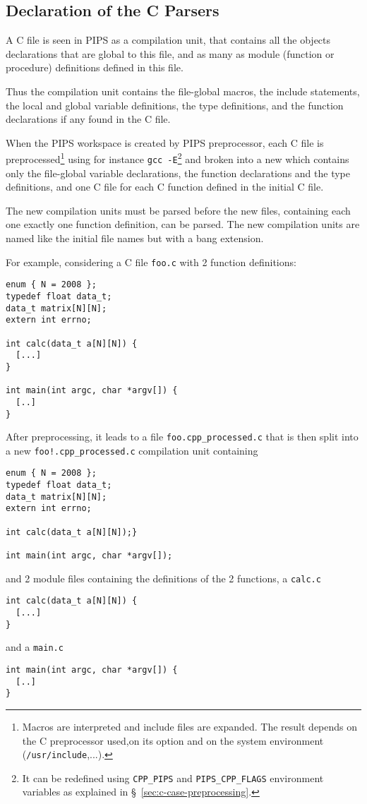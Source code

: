 \documentclass[a4paper]{report}
\begin{document}
\subsection{Declaration of the C Parsers}
\label{subsection:declaration-of-the-C-parsers}

A C file is seen in PIPS as a compilation unit, that contains all the
objects declarations that are global to this file, and as many as module
(function or procedure) definitions defined in this file.

Thus the compilation unit contains the file-global macros, the include
statements, the local and global variable definitions, the type
definitions, and the function declarations if any found in the C file.

When the PIPS workspace is created by PIPS preprocessor, each C file is
preprocessed\footnote{Macros are interpreted and include files are
  expanded. The result depends on the C preprocessor used,on its option
  and on the system environment (\texttt{/usr/include},...).} using for
instance \texttt{gcc -E}\footnote{It can be redefined using
  \texttt{CPP\_PIPS} and \texttt{PIPS\_CPP\_FLAGS} environment variables
  as explained in \S~\ref{sec:c-case-preprocessing}.} and broken into a
new  which contains only the file-global variable
declarations, the function declarations and the type definitions, and one
C file for each C function defined in the initial C file.

The new compilation units must be parsed before the new files, containing
each one exactly one function definition, can be parsed. The new
compilation units are named like the initial file names but with a bang
extension.

For example, considering a C file \verb|foo.c| with 2 function
definitions:
\begin{lstlisting}
enum { N = 2008 };
typedef float data_t;
data_t matrix[N][N];
extern int errno;

int calc(data_t a[N][N]) {
  [...]
}

int main(int argc, char *argv[]) {
  [..]
}
\end{lstlisting}
After preprocessing, it leads to a file \verb|foo.cpp_processed.c| that is
then split into a new \verb|foo!.cpp_processed.c| compilation unit
containing
\begin{lstlisting}
enum { N = 2008 };
typedef float data_t;
data_t matrix[N][N];
extern int errno;

int calc(data_t a[N][N]);}

int main(int argc, char *argv[]);
\end{lstlisting}
and 2 module files containing the definitions of the 2 functions, a
\verb|calc.c|
\begin{lstlisting}
int calc(data_t a[N][N]) {
  [...]
}
\end{lstlisting}
and a \verb|main.c|
\begin{lstlisting}
int main(int argc, char *argv[]) {
  [..]
}
\end{lstlisting}
\end{document}
